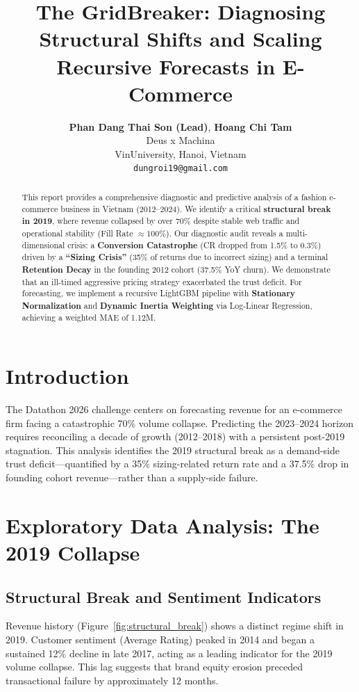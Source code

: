 \documentclass{article}
\title{The GridBreaker: Diagnosing Structural Shifts and Scaling Recursive Forecasts in E-Commerce}
\author{
  \textbf{Phan Dang Thai Son (Lead)}, \textbf{Hoang Chi Tam} \\
  Deus x Machina \\
  VinUniversity, Hanoi, Vietnam \\
  \texttt{dungroi19@gmail.com}
}
\begin{document}
\maketitle

\begin{abstract}
This report provides a comprehensive diagnostic and predictive analysis of a fashion e-commerce business in Vietnam (2012--2024). We identify a critical \textbf{structural break in 2019}, where revenue collapsed by over 70\% despite stable web traffic and operational stability (Fill Rate $\approx 100\%$). Our diagnostic audit reveals a multi-dimensional crisis: a \textbf{Conversion Catastrophe} (CR dropped from 1.5\% to 0.3\%) driven by a \textbf{``Sizing Crisis''} (35\% of returns due to incorrect sizing) and a terminal \textbf{Retention Decay} in the founding 2012 cohort (37.5\% YoY churn). We demonstrate that an ill-timed aggressive pricing strategy exacerbated the trust deficit. For forecasting, we implement a recursive LightGBM pipeline with \textbf{Stationary Normalization} and \textbf{Dynamic Inertia Weighting} via Log-Linear Regression, achieving a weighted MAE of 1.12M. 
\end{abstract}

\section{Introduction}
The Datathon 2026 challenge centers on forecasting revenue for an e-commerce firm facing a catastrophic 70\% volume collapse. Predicting the 2023--2024 horizon requires reconciling a decade of growth (2012--2018) with a persistent post-2019 stagnation. This analysis identifies the 2019 structural break as a demand-side trust deficit—quantified by a 35\% sizing-related return rate and a 37.5\% drop in founding cohort revenue—rather than a supply-side failure. 

\section{Exploratory Data Analysis: The 2019 Collapse}

\subsection{Structural Break and Sentiment Indicators}
Revenue history (Figure~\ref{fig:structural_break}) shows a distinct regime shift in 2019. Customer sentiment (Average Rating) peaked in 2014 and began a sustained 12\% decline in late 2017, acting as a leading indicator for the 2019 volume collapse. This lag suggests that brand equity erosion preceded transactional failure by approximately 12 months.
\end{document}

